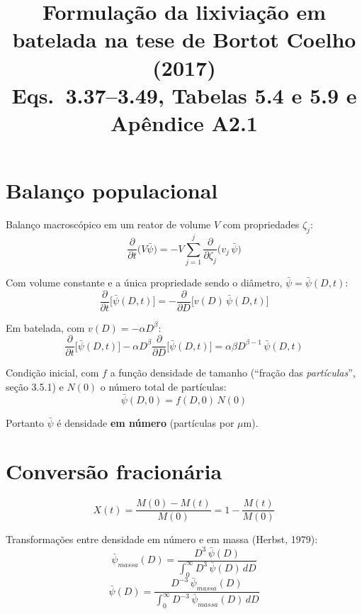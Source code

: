 \documentclass[11pt,a4paper]{article}
\title{Formulação da lixiviação em batelada na tese de Bortot Coelho (2017)\\
\large Eqs.~3.37--3.49, Tabelas 5.4 e 5.9 e Apêndice A2.1}
\author{}
\date{}
\begin{document}
\maketitle

\section{Balanço populacional}

Balanço macroscópico em um reator de volume $V$ com propriedades $\zeta_j$:
\begin{equation}\tag{3.37}
\frac{\partial}{\partial t}\big(V\bar\psi\big) = -V\sum_{j=1}^{j}\frac{\partial}{\partial \zeta_j}\big(v_j\,\bar\psi\big)
\end{equation}

Com volume constante e a única propriedade sendo o diâmetro, $\bar\psi = \bar\psi(D,t)$:
\begin{equation}\tag{3.38}
\frac{\partial}{\partial t}\big[\bar\psi(D,t)\big] = -\frac{\partial}{\partial D}\Big[v(D)\,\bar\psi(D,t)\Big]
\end{equation}

Em batelada, com $v(D) = -\alpha D^{\beta}$:
\begin{equation}\tag{3.44}
\frac{\partial}{\partial t}\big[\bar\psi(D,t)\big] - \alpha D^{\beta}\frac{\partial}{\partial D}\big[\bar\psi(D,t)\big] = \alpha\beta D^{\beta-1}\,\bar\psi(D,t)
\end{equation}

Condição inicial, com $f$ a função densidade de tamanho (``fração das \emph{partículas}'', seção 3.5.1) e $N(0)$ o número total de partículas:
\begin{equation}\tag{3.45}
\bar\psi(D,0) = f(D,0)\,N(0)
\end{equation}

Portanto $\bar\psi$ é densidade \textbf{em número} (partículas por $\mu$m).

\section{Conversão fracionária}

\begin{equation}\tag{3.46}
X(t) = \frac{M(0)-M(t)}{M(0)} = 1 - \frac{M(t)}{M(0)}
\end{equation}

Transformações entre densidade em número e em massa (Herbst, 1979):
\begin{equation}\tag{3.47}
\bar\psi_{massa}(D) = \frac{D^{3}\,\bar\psi(D)}{\displaystyle\int_0^\infty D^{3}\,\bar\psi(D)\,dD}
\end{equation}
\begin{equation}\tag{3.48}
\bar\psi(D) = \frac{D^{-3}\,\bar\psi_{massa}(D)}{\displaystyle\int_0^\infty D^{-3}\,\bar\psi_{massa}(D)\,dD}
\end{equation}
\end{document}
